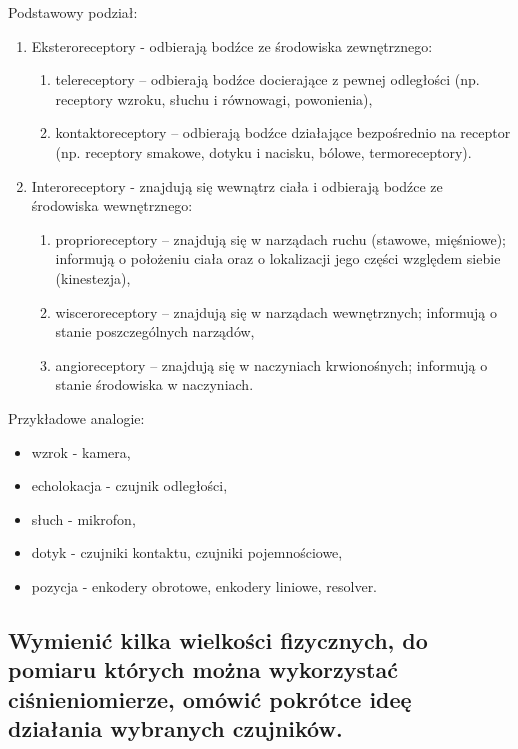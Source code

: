 Podstawowy podział:
\begin{enumerate}
    \item Eksteroreceptory - odbierają bodźce ze środowiska zewnętrznego:
    \begin{enumerate}
        \item telereceptory – odbierają bodźce docierające z pewnej odległości (np. receptory
wzroku, słuchu i równowagi, powonienia),
        \item kontaktoreceptory – odbierają bodźce działające bezpośrednio na receptor (np.
receptory smakowe, dotyku i nacisku, bólowe, termoreceptory).
    \end{enumerate}
    \item Interoreceptory - znajdują się wewnątrz ciała i odbierają bodźce ze środowiska wewnętrznego:
    \begin{enumerate}
        \item proprioreceptory – znajdują się w narządach ruchu (stawowe, mięśniowe); informują
o położeniu ciała oraz o lokalizacji jego części względem siebie (kinestezja),
        \item wisceroreceptory – znajdują się w narządach wewnętrznych; informują o stanie
poszczególnych narządów,
        \item angioreceptory – znajdują się w naczyniach krwionośnych; informują o stanie
środowiska w naczyniach.
    \end{enumerate}
\end{enumerate}

Przykładowe analogie:
\begin{itemize}
    \item wzrok - kamera,
    \item echolokacja - czujnik odległości,
    \item słuch - mikrofon,
    \item dotyk - czujniki kontaktu, czujniki pojemnościowe,
    \item pozycja - enkodery obrotowe, enkodery liniowe, resolver.
\end{itemize}


\subsection{Wymienić kilka wielkości fizycznych, do pomiaru których można wykorzystać ciśnieniomierze, omówić pokrótce ideę działania wybranych czujników.}

